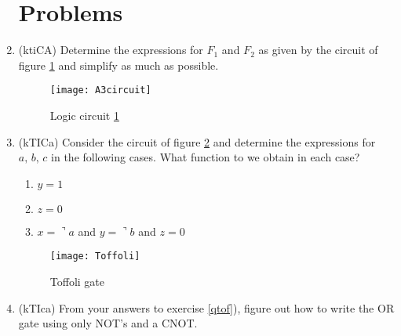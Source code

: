 \documentclass{article}
\begin{document}
\begin{enumerate}
\section{Problems}
\item (ktiCA) Determine the expressions for $F_1$ and $F_2$ as given by the circuit of figure \ref{circuit} and simplify as much as possible.
	\begin{figure}[h]
	\begin{center}
		\texttt{[image: A3circuit]}
		\caption{Logic circuit \ref{circuit}}
		\label{circuit}
	\end{center}
	\end{figure}
\item\label{qtof} (kTICa) Consider the circuit of figure \ref{toffoli} and determine the expressions for $a,\,b,\,c$ in the following cases. What function to we obtain in each case?
	\begin{enumerate}
		\item $y=1$
		\item $z=0$
		\item $x=\urcorner a$ and $y=\urcorner b$ and $z=0$
	\end{enumerate}
	\begin{figure}[h]
	\begin{center}
		\texttt{[image: Toffoli]}
		\caption{Toffoli gate}
		\label{toffoli}
	\end{center}
	\end{figure}
\item (kTIca) From your answers to exercise \ref{qtof}), figure out how to write the OR gate using only NOT's and a CNOT.
\end{enumerate}
\end{document}
